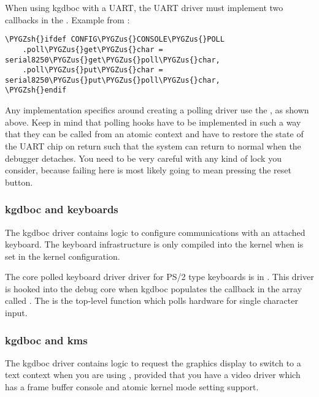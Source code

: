 \documentclass[a4paper,8pt,english]{sphinxmanual}
\def\PYGZus{\char`\_}
\def\PYGZsh{\char`\#}
\begin{document}
When using kgdboc with a UART, the UART driver must implement two
callbacks in the .
Example from :

\begin{Verbatim}[commandchars=\\\{\}]
\PYGZsh{}ifdef CONFIG\PYGZus{}CONSOLE\PYGZus{}POLL
    .poll\PYGZus{}get\PYGZus{}char = serial8250\PYGZus{}get\PYGZus{}poll\PYGZus{}char,
    .poll\PYGZus{}put\PYGZus{}char = serial8250\PYGZus{}put\PYGZus{}poll\PYGZus{}char,
\PYGZsh{}endif
\end{Verbatim}

Any implementation specifics around creating a polling driver use the
, as shown above. Keep in mind that
polling hooks have to be implemented in such a way that they can be
called from an atomic context and have to restore the state of the UART
chip on return such that the system can return to normal when the
debugger detaches. You need to be very careful with any kind of lock you
consider, because failing here is most likely going to mean pressing the
reset button.


\subsubsection{kgdboc and keyboards}
\label{dev-tools/kgdb:kgdboc-and-keyboards}
The kgdboc driver contains logic to configure communications with an
attached keyboard. The keyboard infrastructure is only compiled into the
kernel when  is set in the kernel configuration.

The core polled keyboard driver driver for PS/2 type keyboards is in
. This driver is hooked into the debug core
when kgdboc populates the callback in the array called
. The  is the top-level
function which polls hardware for single character input.


\subsubsection{kgdboc and kms}
\label{dev-tools/kgdb:kgdboc-and-kms}
The kgdboc driver contains logic to request the graphics display to
switch to a text context when you are using , provided
that you have a video driver which has a frame buffer console and atomic
kernel mode setting support.
\end{document}
